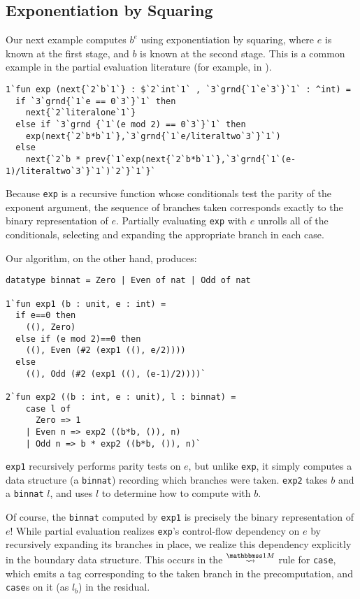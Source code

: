 \subsection{Exponentiation by Squaring}

Our next example computes $b^e$ using exponentiation by squaring, where $e$ is
known at the first stage, and $b$ is known at the second stage. This is a common
example in the partial evaluation literature (for example, in \cite{jones96}).
%
\begin{lstlisting} 
1`fun exp (next{`2`b`1`} : $`2`int`1` , `3`grnd{`1`e`3`}`1` : ^int) = 
  if `3`grnd{`1`e == 0`3`}`1` then 
    next{`2`literalone`1`}
  else if `3`grnd {`1`(e mod 2) == 0`3`}`1` then
    exp(next{`2`b*b`1`},`3`grnd{`1`e/literaltwo`3`}`1`)
  else 
    next{`2`b * prev{`1`exp(next{`2`b*b`1`},`3`grnd{`1`(e-1)/literaltwo`3`}`1`)`2`}`1`}`
\end{lstlisting}
%
Because \texttt{exp} is a recursive function whose conditionals test the parity
of the exponent argument, the sequence of branches taken corresponds exactly to
the binary representation of $e$. Partially evaluating \texttt{exp} with $e$
unrolls all of the conditionals, selecting and expanding the appropriate branch
in each case.

Our algorithm, on the other hand, produces:
%
\begin{lstlisting} 
datatype binnat = Zero | Even of nat | Odd of nat

1`fun exp1 (b : unit, e : int) =
  if e==0 then
    ((), Zero)
  else if (e mod 2)==0 then 
    ((), Even (#2 (exp1 ((), e/2))))
  else 
    ((), Odd (#2 (exp1 ((), (e-1)/2))))`

2`fun exp2 ((b : int, e : unit), l : binnat) =
    case l of
      Zero => 1
    | Even n => exp2 ((b*b, ()), n)
    | Odd n => b * exp2 ((b*b, ()), n)`
\end{lstlisting}
%
\texttt{exp1} recursively performs parity tests on $e$, but unlike \texttt{exp},
it simply computes a data structure (a \texttt{binnat}) recording which branches
were taken. \texttt{exp2} takes $b$ and a \texttt{binnat} $l$, and uses $l$ to
determine how to compute with $b$.

Of course, the \texttt{binnat} computed by \texttt{exp1} is precisely the binary
representation of $e$! While partial evaluation realizes \texttt{exp}'s
control-flow dependency on $e$ by recursively expanding its branches in place,
we realize this dependency explicitly in the boundary data structure. This
occurs in the $\splitonesym$ rule for \texttt{case}, which emits a tag
corresponding to the taken branch in the precomputation, and \texttt{case}s on
it (as $l_b$) in the residual.

